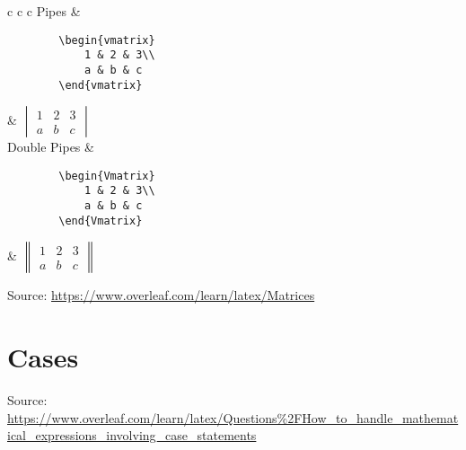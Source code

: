 \documentclass[10pt, letterpaper]{article}
\begin{document}
\begin{center}
\begin{tabular}{c c c}
	\hline
	Pipes & \begin{lstlisting}
		\begin{vmatrix}
			1 & 2 & 3\\
			a & b & c
		\end{vmatrix}
		\end{lstlisting} & $\begin{vmatrix}
			1 & 2 & 3\\
			a & b & c
		\end{vmatrix}$\\
	\hline
	Double Pipes & \begin{lstlisting}
		\begin{Vmatrix}
			1 & 2 & 3\\
			a & b & c
		\end{Vmatrix}
		\end{lstlisting} & $\begin{Vmatrix}
			1 & 2 & 3\\
			a & b & c
		\end{Vmatrix}$\\
	\hline
	\end{tabular}
\end{center}

Source: \url{https://www.overleaf.com/learn/latex/Matrices}

\section{Cases}
Source: \url{https://www.overleaf.com/learn/latex/Questions\%2FHow_to_handle_mathematical_expressions_involving_case_statements}
\end{document}
